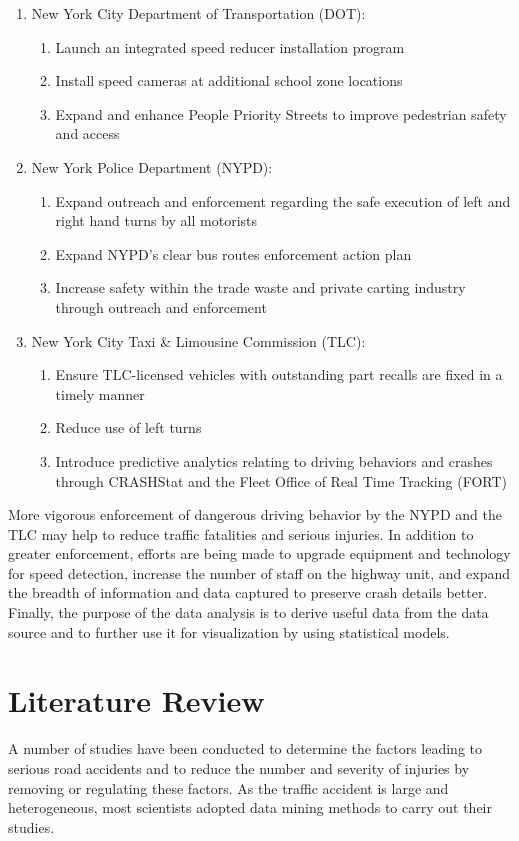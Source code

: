 \documentclass[conference]{IEEEtran}
\begin{document}
\begin{enumerate}  
	\item New York City Department of Transportation (DOT):
	\begin{enumerate}
		\item Launch an integrated speed reducer installation program
		\item Install speed cameras at additional school zone locations
		\item Expand and enhance People Priority Streets to improve pedestrian safety and access
	\end{enumerate}  
	\item New York Police Department (NYPD):
	\begin{enumerate}
		\item Expand outreach and enforcement regarding the safe execution of left and right hand turns by all motorists
		\item Expand NYPD's clear bus routes enforcement action plan
		\item Increase safety within the trade waste and private carting industry through outreach and enforcement   
	\end{enumerate}
	\item New York City Taxi \& Limousine Commission (TLC):
	\begin{enumerate}
		\item Ensure TLC-licensed vehicles with outstanding part recalls are fixed in a timely manner
		\item Reduce use of left turns
		\item Introduce predictive analytics relating to driving behaviors and crashes through CRASHStat and the Fleet Office of Real Time Tracking (FORT)
	\end{enumerate}
\end{enumerate}

More vigorous enforcement of dangerous driving behavior by the NYPD and the TLC may help to reduce traffic fatalities and serious injuries. In addition to greater enforcement, efforts are being made to upgrade equipment and technology for speed detection, increase the number of staff on the highway unit, and expand the breadth of information and data captured to preserve crash details better. Finally, the purpose of the data analysis is to derive useful data from the data source and to further use it for visualization by using statistical models.     
%
%
%
\section{Literature Review}
A number of studies have been conducted to determine the factors leading to serious road accidents and to reduce the number and severity of injuries by removing or regulating these factors. As the traffic accident is large and heterogeneous, most scientists adopted data mining methods to carry out their studies.
\end{document}
